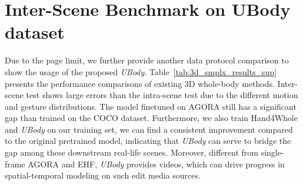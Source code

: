 \documentclass[10pt,twocolumn,letterpaper]{article}
\newcommand{\dataname}{\emph{UBody}\xspace}
\begin{document}
\section{Inter-Scene Benchmark on UBody dataset}
\label{sec:inter_bench}

Due to the page limit, we further provide another data protocol comparison to show the usage of the proposed \dataname. Table~\ref{tab:3d_smplx_results_sup} presents the performance comparisons of existing 3D whole-body methods. Inter-scene test shows large errors than the intra-scene test due to the different motion and gesture distributions.
The model finetuned on AGORA still has a significant gap than trained on the COCO dataset.
Furthermore, we also train Hand4Whole and \dataname on our training set, we can find a consistent improvement compared to the original pretrained model, indicating that \dataname can serve to bridge the gap among these downstream real-life scenes. 
Moreover, different from single-frame AGORA and EHF, \dataname provides videos, which can drive progress in spatial-temporal modeling on such edit media sources.
\end{document}
